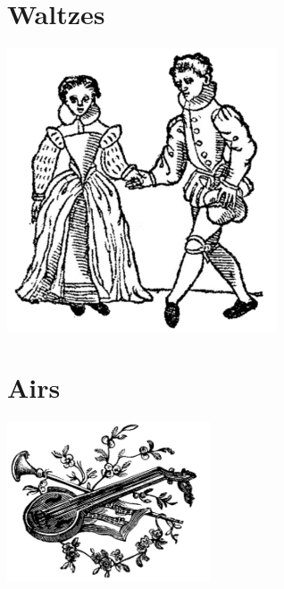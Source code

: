 \documentclass[12pt]{report}
\newcommand*{\cleartoleftpage}{%
  \clearpage
   \ifodd\value{page}\hbox{}\newpage\fi
}
\begin{document}
\chapter*{Waltzes}
\begin{center}
\includegraphics[width=8cm]{../images/waltzes}
\end{center}


\cleartoleftpage
\chapter*{Airs}
\begin{center}
\includegraphics[width=6cm]{../images/misc}
\end{center}


\end{document}
